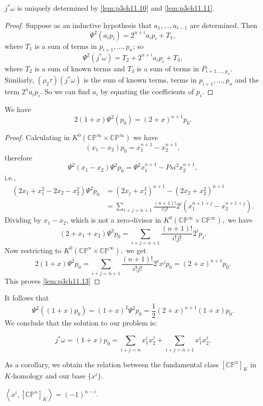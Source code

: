 \documentclass[../main]{subfiles}
\begin{document}
\begin{lemma} \label{lem:p3ch11.12}
$j^*\omega$ is uniquely determined by \ref{lem:p3ch11.10} and \ref{lem:p3ch11.11}.
\end{lemma}
\begin{proof}
Suppose as an inductive hypothesis that $a_1,...,a_{i-1}$ are determined. Then 
$$\Psi^2(a_ip_i)=2^{n+i}a_ip_i+T_1,$$ 
where $T_1$ is a sum of terms in $p_{i+1},...,p_n$; so 
$$\Psi^2(j^*\omega)=T_2+2^{n+i}a_ip_i+T_3,$$
where $T_2$ is a sum of known terms and $T_3$ is a sum of terms in $P_{i+1,...,p_n}.$ Similarly, $(\rho_2\tau)(j^*\omega)$ is the sum of known terms, terms in $p_{i+1},...,p_n$ and the term $2^na_ip_i$. So we can find $a_i$ by equating the coefficients of $p_i$.
\end{proof}
\begin{lemma}\label{lem:p3ch11.13}
We have 
$$2(1+x)\Psi^2(p_0)=(2+x)^{n+1}p_0.$$
\end{lemma}
\begin{proof}
Calculating in $K^0(\mathbb{CP}^\infty\times\mathbb{CP}^\infty)$ we have 
$$(x_1-x_2)p_0=x_1^{n+1}-x_2^{n+1},$$
therefore 
$$\Psi^2(x_1-x_2)\Psi^2p_0=\Psi^2x_1^{n+1}-Psi^2x_2^{n+1},$$
i.e.,
\begin{align}
    (2x_1+x_1^2-2x_2-x_2^2)\Psi^2p_0 &= (2x_j+x_1^2)^{n+1}-(2x_2+x_2^2)^{n+1} \nonumber \\
    &=\sum_{i+j=n+1}\frac{(n+1)!}{i!j!}2^i(x_1^{n+1+j}-x_2^{n+1+j}). \nonumber
\end{align}
Dividing by $x_1-x_2$, which is not a zero-divisor in $K^0(\mathbb{CP}^\infty\times\mathbb{CP}^\infty),$ we have 
$$(2+x_1+x_2)\Psi^2p_0=\sum_{i+j=n+1}\frac{(n+1)!}{i!j!}2^ip_j.$$
Now restricting to $K^0(\mathbb{CP}^n\times\mathbb{CP}^\infty),$ we get
$$2(1+x)\Psi^2p_0=\sum_{i+j=n+1}\frac{(n+1)!}{i!j!}2^ix^jp_0=(2+x)^{n+1}p_0.$$
This proves \ref{lem:p3ch11.13}
\end{proof}
\par It follows that 
$$\Psi^2((1+x)p_0)=(1+x)^2\Psi^2p_0=\frac{1}{2}(2+x)^{n+1}(1+x)p_0.$$
We conclude that the solution to our problem is:
\begin{theorem}\label{thm:p3ch11.14}
$$j^*\omega=(1+x)p_0=\sum_{i+j=n}x_1^ix_2^j + \sum_{i+j=n+1}x_1^ix_2^j.$$
\end{theorem}
As a corollary, we obtain the relation between the fundamental class $[\mathbb{CP}^n]_K$ in $K$-homology and our base $\{x^i\}$.
\begin{theorem}\label{thm:p3ch11.15}
$\left<x^i,[\mathbb{CP}^n]_K\right>=(-1)^{n-i}.$
\end{theorem}
\end{document}
